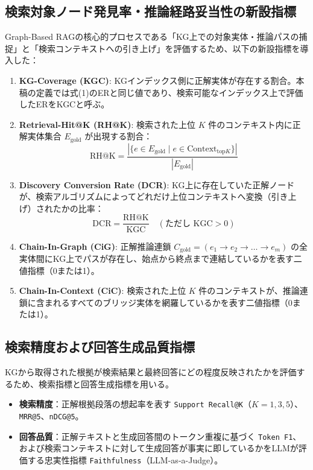 \documentclass[a4j,dvipdfmx]{jsarticle}
\begin{document}
\subsection{検索対象ノード発見率・推論経路妥当性の新設指標}
Graph-Based RAGの核心的プロセスである「KG上での対象実体・推論パスの捕捉」と「検索コンテキストへの引き上げ」を評価するため、以下の新設指標を導入した：
\begin{enumerate}
    \item \textbf{KG-Coverage (KGC)}: KGインデックス側に正解実体が存在する割合。本稿の定義では式(1)のERと同じ値であり、検索可能なインデックス上で評価したERをKGCと呼ぶ。
    \item \textbf{Retrieval-Hit@K (RH@K)}: 検索された上位 $K$ 件のコンテキスト内に正解実体集合 $E_{\text{gold}}$ が出現する割合：
    \begin{equation}
        \text{RH@K} = \frac{|\{e \in E_{\text{gold}} \mid e \in \text{Context}_{\text{top}K}\}|}{|E_{\text{gold}}|}
    \end{equation}
    \item \textbf{Discovery Conversion Rate (DCR)}: KG上に存在していた正解ノードが、検索アルゴリズムによってどれだけ上位コンテキストへ変換（引き上げ）されたかの比率：
    \begin{equation}
        \text{DCR} = \frac{\text{RH@K}}{\text{KGC}} \quad (\text{ただし } \text{KGC} > 0)
    \end{equation}
    \item \textbf{Chain-In-Graph (CiG)}: 正解推論連鎖 $C_{\text{gold}} = (e_1 \to e_2 \to \dots \to e_m)$ の全実体間にKG上でパスが存在し、始点から終点まで連結しているかを表す二値指標（0または1）。
    \item \textbf{Chain-In-Context (CiC)}: 検索された上位 $K$ 件のコンテキストが、推論連鎖に含まれるすべてのブリッジ実体を網羅しているかを表す二値指標（0または1）。
\end{enumerate}

\subsection{検索精度および回答生成品質指標}
KGから取得された根拠が検索結果と最終回答にどの程度反映されたかを評価するため、検索指標と回答生成指標を用いる。
\begin{itemize}
    \item \textbf{検索精度}：正解根拠段落の想起率を表す \texttt{Support Recall@K}（$K=1,3,5$）、\texttt{MRR@5}、\texttt{nDCG@5}。
    \item \textbf{回答品質}：正解テキストと生成回答間のトークン重複に基づく \texttt{Token F1}、および検索コンテキストに対して生成回答が事実に即しているかをLLMが評価する忠実性指標 \texttt{Faithfulness}（LLM-as-a-Judge）。
\end{itemize}
\end{document}
